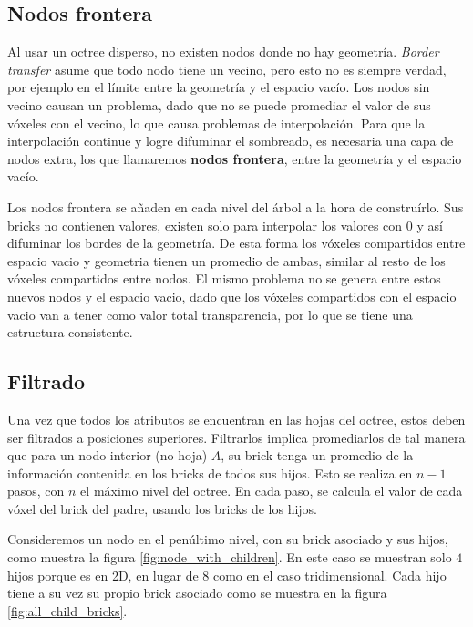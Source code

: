 
\subsection{Nodos frontera}

Al usar un octree disperso, no existen nodos donde no hay geometría.
\textit{Border transfer} asume que todo nodo tiene un vecino, pero esto no es siempre verdad, por ejemplo en el límite entre la geometría y el espacio vacío.
Los nodos sin vecino causan un problema, dado que no se puede promediar el valor de sus vóxeles con el vecino, lo que causa problemas de interpolación.
Para que la interpolación continue y logre difuminar el sombreado, es necesaria una capa de nodos extra, los que llamaremos \textbf{nodos frontera}, entre la geometría y el espacio vacío.

Los nodos frontera se añaden en cada nivel del árbol a la hora de construírlo.
Sus bricks no contienen valores, existen solo para interpolar los valores con 0 y así difuminar los bordes de la geometría.
De esta forma los vóxeles compartidos entre espacio vacio y geometria tienen un promedio de ambas, similar al resto de los vóxeles compartidos entre nodos.
El mismo problema no se genera entre estos nuevos nodos y el espacio vacio, dado que los vóxeles compartidos con el espacio vacio van a tener como valor total transparencia, por lo que se tiene una estructura consistente.


\subsection{Filtrado}\label{design:filtering}

Una vez que todos los atributos se encuentran en las hojas del octree, estos deben ser filtrados a posiciones superiores.
Filtrarlos implica promediarlos de tal manera que para un nodo interior (no hoja) $A$, su brick tenga un promedio de la información contenida en los bricks de todos sus hijos.
Esto se realiza en $n - 1$ pasos, con $n$ el máximo nivel del octree.
En cada paso, se calcula el valor de cada vóxel del brick del padre, usando los bricks de los hijos.

Consideremos un nodo en el penúltimo nivel, con su brick asociado y sus hijos, como muestra la figura \ref{fig:node_with_children}.
En este caso se muestran solo $4$ hijos porque es en 2D, en lugar de $8$ como en el caso tridimensional.
Cada hijo tiene a su vez su propio brick asociado como se muestra en la figura \ref{fig:all_child_bricks}.

